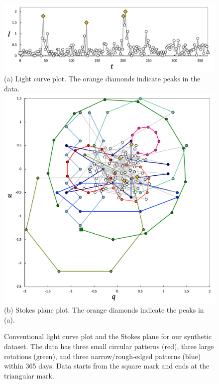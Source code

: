 \begin{figure}[t]
    \centering
    \vspace{3mm}
    \includegraphics[width=.8\linewidth]{figures/synthesisDataLightCurveLabel_revised.png}\\
    \footnotesize{\sf (a) Light curve plot. The orange diamonds indicate peaks in the data.}\\
    \includegraphics[width=.83\linewidth]{figures/synthesisDataStokesLabel_revised.png}\\
    \footnotesize{\sf (b) Stokes plane plot. The orange diamonds indicate the peaks in (a).}
    \caption{Conventional light curve plot and the Stokes plane for our synthetic dataset. The data has three small circular patterns (red), three large rotations (green), and three narrow/rough-edged patterns (blue) within 365 days. Data starts from the square mark and ends at the triangular mark.}
    \label{fig:synthesisData}
\end{figure}





